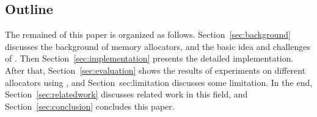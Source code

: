 \subsection*{Outline}

The remained of this paper is organized as follows. Section~\ref{sec:background} discusses the background of memory allocators, and the basic idea and challenges of \MP{}. Then Section~\ref{sec:implementation} presents the detailed implementation. After that, Section~\ref{sec:evaluation} shows the results of experiments on different allocators using \MP{}, and Section~{sec:limitation} discusses some limitation. In the end,  Section~\ref{sec:relatedwork} discusses related work in this field, and Section~\ref{sec:conclusion} concludes this paper. 
